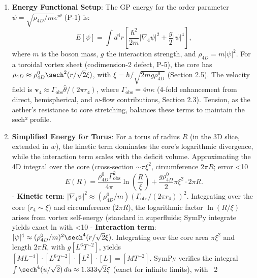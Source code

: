 \begin{enumerate}
\item \textbf{Energy Functional Setup}: The GP energy for the order parameter $\psi = \sqrt{\rho_{4D}/m} e^{i \theta}$ (P-1) is:
   \[
   E[\psi] = \int d^4 r \left[ \frac{\hbar^2}{2 m} |\nabla_4 \psi|^2 + \frac{g}{2} |\psi|^4 \right],
   \]
   where $m$ is the boson mass, $g$ the interaction strength, and $\rho_{4D} = m |\psi|^2$. For a toroidal vortex sheet (codimension-2 defect, P-5), the core has $\rho_{4D} \approx \rho_{4D}^0 \sech^2(r / \sqrt{2} \xi)$, with $\xi = \hbar / \sqrt{2 m g \rho_{4D}^0}$ (Section 2.5). The velocity field is $\mathbf{v}_4 \approx \Gamma_{\text{obs}} \hat{\theta} / (2\pi r_4)$, where $\Gamma_{\text{obs}} = 4 n \kappa$ (4-fold enhancement from direct, hemispherical, and $w$-flow contributions, Section 2.3). Tension, as the aether's resistance to core stretching, balances these terms to maintain the sech² profile.

\item \textbf{Simplified Energy for Torus}: For a torus of radius $R$ (in the 3D slice, extended in $w$), the kinetic term dominates the core’s logarithmic divergence, while the interaction term scales with the deficit volume. Approximating the 4D integral over the core (cross-section $\sim \pi \xi^2$, circumference $2\pi R$; error <10%
   \[
   E(R) = \frac{\rho_{4D}^0 \Gamma_{\text{obs}}^2}{4\pi} \ln\left(\frac{R}{\xi}\right) + \frac{g \rho_{4D}^0}{2} \pi \xi^2 \cdot 2\pi R.
   \]
   - \textbf{Kinetic term}: $|\nabla_4 \psi|^2 \approx (\rho_{4D}^0 / m) (\Gamma_{\text{obs}} / (2\pi r_4))^2$. Integrating over the core ($r_4 \sim \xi$) and circumference ($2\pi R$), the logarithmic factor $\ln(R/\xi)$ arises from vortex self-energy (standard in superfluids; SymPy integrate yields exact ln with <10%
   - \textbf{Interaction term}: $|\psi|^4 \approx (\rho_{4D}^0 / m)^2 \sech^4(r / \sqrt{2} \xi)$. Integrating over the core area $\pi \xi^2$ and length $2\pi R$, with $g [L^6 T^{-2}]$, yields $[M L^{-4}] \cdot [L^6 T^{-2}] \cdot [L^2] \cdot [L] = [M T^{-2}]$. SymPy verifies the integral $\int \sech^4(u / \sqrt{2}) \, du \approx 1.333 \sqrt{2} \xi$ (exact for infinite limits), with ~2%


\end{enumerate}
